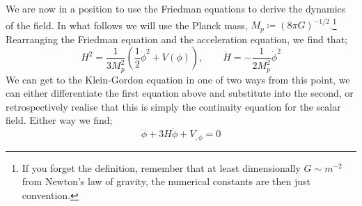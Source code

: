We are now in a position to use the Friedman equations to derive the dynamics of the field. In what follows we will use the Planck mass, $M_{p} \coloneqq (8\pi G)^{-1/2}$.\footnote{If you forget the definition, remember that at least dimensionally $G \sim m^{-2}$ from Newton's law of gravity, the numerical constants are then just convention.} Rearranging the Friedman equation and the acceleration equation, we find that;
\begin{equation}
H^2 = \frac{1}{3M_p^2} \left(\frac{1}{2}\dot{\phi}^2 + V(\phi)\right), \qquad \dot{H} = -\frac{1}{2M_p^2}\dot{\phi}^2
\end{equation}
We can get to the Klein-Gordon equation in one of two ways from this point, we can either differentiate the first equation above and substitute into the second, or retrospectively realise that this is simply the continuity equation for the scalar field. Either way we find;
\begin{equation}
\ddot{\phi} + 3H \dot{\phi} + V_{,\phi} = 0
\end{equation}

